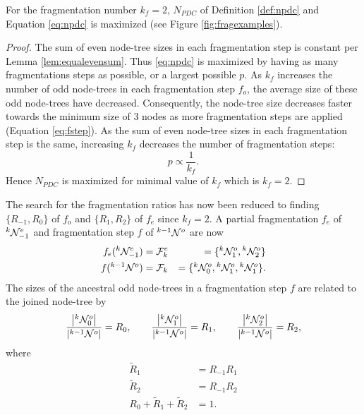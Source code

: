 \begin{theorem}\label{the:fragnumber}
  For the fragmentation number $k_f=2$, $N_{PDC}$ of Definition \ref{def:npdc} and Equation \eqref{eq:npdc} is maximized (see Figure \ref{fig:fragexamples}). 
\end{theorem}
\begin{proof}
  The sum of even node-tree sizes in each fragmentation step is constant per Lemma \ref{lem:equalevensum}. Thus \eqref{eq:npdc} is maximized by having as many fragmentations steps as possible, or a largest possible $p$.  As $k_f$ increases the number of odd node-trees in each fragmentation step $f_o$, the average size of these odd node-trees have decreased. Consequently, the node-tree size decreases faster towards the minimum size of 3 nodes as more fragmentation steps are applied (Equation \eqref{eq:fstep}). As the sum of even node-tree sizes in each fragmentation step is the same, increasing $k_f$ decreases the number of fragmentation steps: 
  \begin{equation}
    p \propto \frac{1}{k_f}.
  \end{equation}
   Hence $N_{PDC}$ is maximized for minimal value of $k_f$ which is $k_f = 2$.
\end{proof}



The search for the fragmentation ratios has now been reduced to finding $\{R_{-1}, R_0\}$ of $f_o$ and $\{R_1, R_2\}$ of $f_e$ since $k_f = 2$. A partial fragmentation $f_e$ of ${}^{k}\mathcal{N}^e_{-1}$ and fragmentation step $f$ of ${}^{k-1}\mathcal{N}^o$ are now
\begin{eqnarray}
  f_e({}^{k}\mathcal{N}^e_{-1})  &= \mathcal{F}^e_k  &=\{{}^{k}\mathcal{N}^{o}_1,{}^{k}\mathcal{N}^o_2\} \label{eq:newpfe}\\
  f({}^{k-1}\mathcal{N}^o)       &= \mathcal{F}_k    &= \{{}^{k}\mathcal{N}^o_0, {}^{k}\mathcal{N}^o_1, {}^{k}\mathcal{N}^o_1\}. \label{eq:newfstep}
\end{eqnarray}
The sizes of the ancestral odd node-trees in a fragmentation step $f$ are related to the joined node-tree by
\begin{equation}
  \frac{\abs{{}^{k}\mathcal{N}^o_0}}{\abs{{}^{k-1}\mathcal{N}^o}} = R_0, \hspace{2em}
  \frac{\abs{{}^{k}\mathcal{N}^o_1}}{\abs{{}^{k-1}\mathcal{N}^o}} = R_1, \hspace{2em}
  \frac{\abs{{}^{k}\mathcal{N}^o_2}}{\abs{{}^{k-1}\mathcal{N}^o}} = R_2,
\end{equation}
where
\begin{align}
  \nonumber  \tilde{R}_1 &= R_{-1}R_1\\
             \tilde{R}_2 &= R_{-1}R_2 \label{eq:bigratios} \\
  \nonumber  R_0 + \tilde{R}_1 + \tilde{R}_2 &= 1. 
\end{align}

